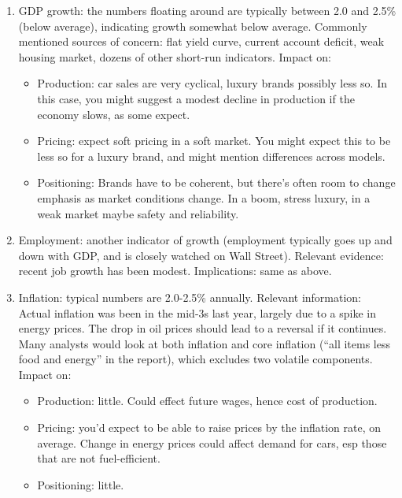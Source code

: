 \documentclass[letterpaper,12pt]{article}
\begin{document}
\begin{enumerate}
\item GDP growth:  the numbers floating around are typically between 2.0 and 2.5\% (below average), indicating growth somewhat below average.    
Commonly mentioned sources of concern:  
flat yield curve, current account deficit, 
weak housing market, 
dozens of other short-run indicators.
Impact on:
\begin{itemize}
\item Production:  car sales are very cyclical, 
luxury brands possibly less so. 
In this case, you might suggest a modest decline in production
if the economy slows, as some expect.   
\item Pricing:  expect soft pricing in a soft market. 
You might expect this to be less so for a luxury brand, 
and might mention differences across models.    

\item Positioning:  Brands have to be coherent, but there's often room to 
change emphasis as market conditions change.  
In a boom, stress luxury, in a weak market maybe safety and reliability.  
\end{itemize}

\item Employment: another indicator of growth (employment typically goes up and down with GDP, and is closely watched on Wall Street).  
Relevant evidence:  recent job growth has been modest. 
Implications:  same as above.  

\item Inflation:  typical numbers are 2.0-2.5\% annually.  
Relevant information:  
Actual inflation was been in the mid-3s last year, 
largely due to a spike in energy prices.  
The drop in oil prices should lead to a reversal if it continues.  
Many analysts would look at both inflation 
and core inflation (``all items less food and energy'' in the report),
which excludes two volatile components.  
Impact on:
\begin{itemize}
\item Production:  little.  
Could effect future wages, hence cost of production.
\item Pricing:  you'd expect to be able to raise prices by the inflation 
rate, on average.  
Change in energy prices could affect demand for cars, esp those that 
are not fuel-efficient.  
\item Positioning:  little.  
\end{itemize}


\end{enumerate}
\end{document}
